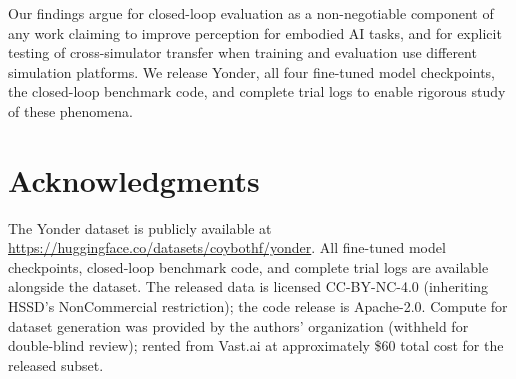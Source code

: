 \documentclass[conference]{IEEEtran}
\begin{document}
Our findings argue for closed-loop evaluation as a non-negotiable component of any work claiming to improve perception for embodied AI tasks, and for explicit testing of cross-simulator transfer when training and evaluation use different simulation platforms. We release Yonder, all four fine-tuned model checkpoints, the closed-loop benchmark code, and complete trial logs to enable rigorous study of these phenomena.

\section*{Acknowledgments}

The Yonder dataset is publicly available at \url{https://huggingface.co/datasets/coybothf/yonder}. All fine-tuned model checkpoints, closed-loop benchmark code, and complete trial logs are available alongside the dataset. The released data is licensed CC-BY-NC-4.0 (inheriting HSSD's NonCommercial restriction); the code release is Apache-2.0. Compute for dataset generation was provided by the authors' organization (withheld for double-blind review); rented from Vast.ai at approximately \$60 total cost for the released subset.
\end{document}
